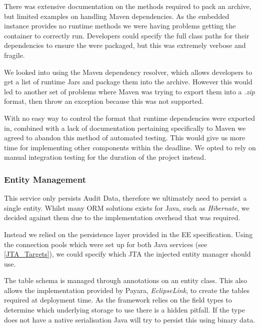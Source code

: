\par
There was extensive documentation on the methods required to pack an archive, but limited examples on handling Maven dependencies. As the embedded instance provides no runtime methods we were having problems getting the container to correctly run. Developers could specify the full class paths for their dependencies to ensure the were packaged, but this was extremely verbose and fragile.

\par
We looked into using the Maven dependency resolver, which allows developers to get a list of runtime Jars and package them into the archive. However this would led to another set of problems where Maven was trying to export them into a \textit{.zip} format, then throw an exception because this was not supported.

\par
With no easy way to control the format that runtime dependencies were exported in, combined with a lack of documentation pertaining specifically to Maven we agreed to abandon this method of automated testing. This would give us more time for implementing other components within the deadline. We opted to rely on manual integration testing for the duration of the project instead.

\subsubsection{Entity Management}
This service only persists Audit Data, therefore we ultimately need to persist a single entity. Whilst many ORM solutions exists for Java, such as \textit{Hibernate}, we decided against them due to the implementation overhead that was required.

\par
Instead we relied on the persistence layer provided in the EE specification. Using the connection pools which were set up for both Java services (see \ref{JTA_Targets}), we could specify which JTA the injected entity manager should use.

\par
The table schema is managed through annotations on an entity class. This also allows the implementation provided by Payara, \textit{EclipseLink}, to create the tables required at deployment time. As the framework relies on the field types to determine which underlying storage to use there is a hidden pitfall. If the type does not have a native serialisation Java will try to persist this using binary data.

